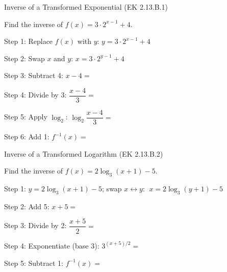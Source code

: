 \documentclass[10pt]{article}
\begin{document}
\vspace{0.06in}

\begin{notesbox}{Inverse of a Transformed Exponential (EK 2.13.B.1)}

Find the inverse of $f(x) = 3 \cdot 2^{x-1} + 4$.

\vspace{4pt}
Step 1: Replace $f(x)$ with $y$: \quad $y = 3 \cdot 2^{x-1} + 4$

\vspace{4pt}
Step 2: Swap $x$ and $y$: \quad $x = 3 \cdot 2^{y-1} + 4$

\vspace{4pt}
Step 3: Subtract 4: \quad $x - 4 = $ \blank{3.5cm}

\vspace{4pt}
Step 4: Divide by 3: \quad $\dfrac{x-4}{3} = $ \blank{3cm}

\vspace{4pt}
Step 5: Apply $\log_2$: \quad $\log_2\!\dfrac{x-4}{3} = $ \blank{3cm}

\vspace{4pt}
Step 6: Add 1: \quad $f^{-1}(x) = $ \blank{5cm}

\end{notesbox}

\vspace{0.06in}

\begin{notesbox}{Inverse of a Transformed Logarithm (EK 2.13.B.2)}

Find the inverse of $f(x) = 2\log_3(x+1) - 5$.

\vspace{4pt}
Step 1: $y = 2\log_3(x+1) - 5$; swap $x \leftrightarrow y$: $\;x = 2\log_3(y+1) - 5$

\vspace{4pt}
Step 2: Add 5: \quad $x + 5 = $ \blank{4cm}

\vspace{4pt}
Step 3: Divide by 2: \quad $\dfrac{x+5}{2} = $ \blank{3.5cm}

\vspace{4pt}
Step 4: Exponentiate (base 3): \quad $3^{(x+5)/2} = $ \blank{3cm}

\vspace{4pt}
Step 5: Subtract 1: \quad $f^{-1}(x) = $ \blank{5cm}

\end{notesbox}
\end{document}
